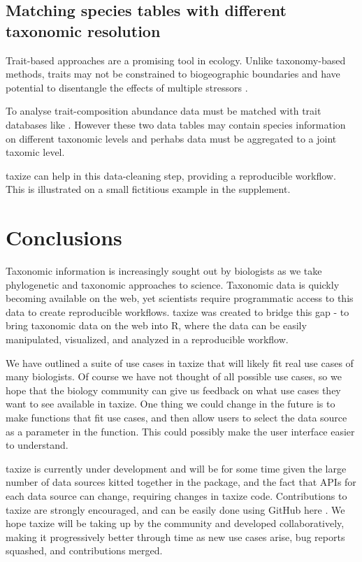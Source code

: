 \documentclass[10pt]{article}\usepackage{graphicx, color}
\begin{document}
\subsection*{Matching species tables with different taxonomic resolution}
Trait-based approaches are a promising tool in ecology. Unlike taxonomy-based methods, traits may not be constrained to biogeographic boundaries \cite{baird_toward_2011} and have potential to disentangle the effects of multiple stressors \cite{statzner_can_2010}. 

To analyse trait-composition abundance data must be matched with trait databases like \cite{usseglio-polatera_biological_2000}. However these two data tables may contain species information on different taxonomic levels and perhabs data must be aggregated to a joint taxomic level.

taxize can help in this data-cleaning step, providing a reproducible workflow. This is illustrated on a small fictitious example in the supplement.


\section*{Conclusions}
Taxonomic information is increasingly sought out by biologists as we take phylogenetic and taxonomic approaches to science. Taxonomic data is quickly becoming available on the web, yet scientists require programmatic access to this data to create reproducible workflows. taxize was created to bridge this gap - to bring taxonomic data on the web into R, where the data can be easily manipulated, visualized, and analyzed in a reproducible workflow.

We have outlined a suite of use cases in taxize that will likely fit real use cases of many biologists. Of course we have not thought of all possible use cases, so we hope that the biology community can give us feedback on what use cases they want to see available in taxize. One thing we could change in the future is to make  functions that fit use cases, and then allow users to select the data source as a parameter in the function. This could possibly make the user interface easier to understand.

taxize is currently under development and will be for some time given the large number of data sources kitted together in the package, and the fact that APIs for each data source can change, requiring changes in taxize code. Contributions to taxize are strongly encouraged, and can be easily done using GitHub here \cite{github_taxize}. We hope taxize will be taking up by the community and developed collaboratively, making it progressively better through time as new use cases arise, bug reports squashed, and contributions merged.
\end{document}
